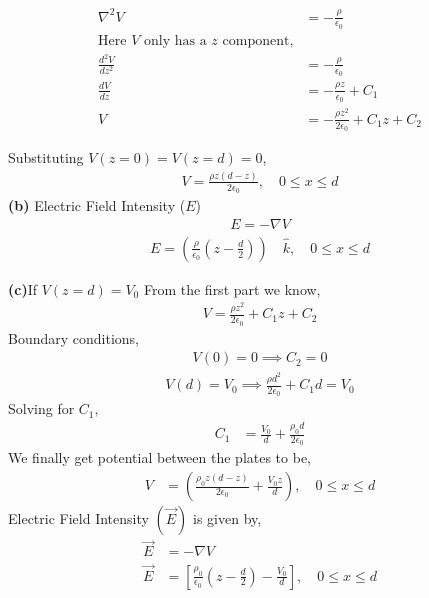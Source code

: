 \documentclass{article}
\begin{document}
\begin{align*}
    \nabla^2 V &= -\frac{\rho}{\epsilon_0} \\
    \text{Here } V \text{ only has a } z \text{ component,} \\
    \frac{d^2 V}{dz^2} &=- \frac{\rho}{\epsilon_0} \\
    \frac{dV}{dz} &= -\frac{\rho z}{\epsilon_0} + C_1 \\
    V &= -\frac{\rho z^2}{2 \epsilon_0} + C_1 z + C_2
\end{align*}

Substituting $ V(z=0) = V(z=d) = 0 $,
\begin{align*}
V = \frac{\rho z (d-z)}{2 \epsilon_0} , \quad 0 \le x \le d
\end{align*}
\textbf{(b)}
Electric Field Intensity ($E$)
\begin{align*}
E = -\nabla V
\end{align*}
\begin{align*}
E = \left(\frac{\rho}{\epsilon_0} \left(z - \frac{d}{2}\right)\right) \quad \hat{k}, \quad 0 \le x \le d
\end{align*}

\textbf{(c)}If $V(z=d) = V_0$\newline
From the first part we know,
\begin{align*}
V = \frac{\rho z^2}{2 \epsilon_0} + C_1 z + C_2
\end{align*}
Boundary conditions,
\begin{align*}
V(0) = 0 \implies C_2 = 0
\end{align*}
\begin{align*}
V(d) = V_0 \implies \frac{\rho d^2}{2 \epsilon_0} + C_1 d = V_0
\end{align*}
Solving for $C_1,$
\begin{align*}
C_1 &= \frac{V_0}{d} + \frac{\rho_0 d}{2 \epsilon_0}
\end{align*}
We finally get potential between the plates to be,
\begin{align*}
V &= \left( \frac{\rho_0 z (d-z)}{2 \epsilon_0} + \frac{V_0 z}{d} \right), \quad 0 \le x \le d
\end{align*}
Electric Field Intensity $(\vec{E})$ is given by,
\begin{align*}
\vec{E} &= -\nabla V \\
\vec{E} &= \left[ \frac{\rho_0}{\epsilon_0} \left( z - \frac{d}{2} \right) - \frac{V_0}{d} \right], \quad 0 \le x \le d
\end{align*}
\end{document}
